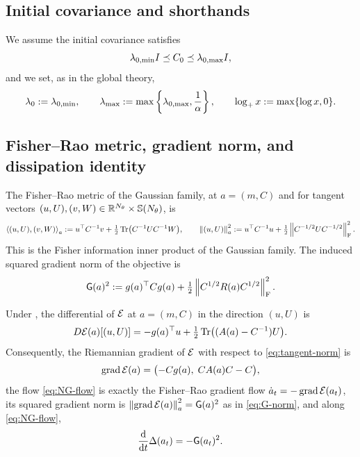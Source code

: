 \subsection{Initial covariance and shorthands}

We assume the initial covariance satisfies
\[
    \lambda_{0,\min}I\preceq C_0\preceq \lambda_{0,\max}I,
\]
and we set, as in the global theory,
\[
    \lambda_0:=\lambda_{0,\min},
    \qquad
    \lambda_{\max}:=
    \max\left\{
        \lambda_{0,\max},\frac1\alpha
    \right\},
    \qquad
    \log_+ x:=\max\{\log x,0\}.
\]

\subsection{Fisher--Rao metric, gradient norm, and dissipation identity}

The Fisher--Rao metric of the Gaussian family, at $a=(m,C)$ and for tangent vectors
$(u,U),(v,W)\in\mathbb{R}^{N_\theta}\times\mathbb{S}(N_\theta)$, is
\begin{equation}
\label{eq:tangent-norm}
    \left\langle (u,U),(v,W)\right\rangle_a
    :=
    u^\top C^{-1}v
    +
    \tfrac12\operatorname{Tr}\bigl(C^{-1}UC^{-1}W\bigr),
    \qquad
    \left\lVert (u,U)\right\rVert_a^2
    :=
    u^\top C^{-1}u+\tfrac12\left\lVert C^{-1/2}UC^{-1/2}\right\rVert_{\mathrm{F}}^2 .
\end{equation}
This is the Fisher information inner product of the Gaussian family. The induced squared
gradient norm of the objective is
\begin{equation}
\label{eq:G-norm}
    \mathsf{G}(a)^2
    :=
    g(a)^\top Cg(a)
    +
    \tfrac12\left\lVert C^{1/2}R(a)C^{1/2}\right\rVert_{\mathrm{F}}^2 .
\end{equation}

\begin{lemma}
\label{lem:metric-dissipation}
Under , the differential of $\mathcal{E}$ at $a=(m,C)$ in the
direction $(u,U)$ is
\[
    D\mathcal{E}(a)[(u,U)]
    =
    -g(a)^\top u
    +
    \tfrac12\operatorname{Tr}\bigl((A(a)-C^{-1})U\bigr).
\]
Consequently, the Riemannian gradient of $\mathcal{E}$ with respect to
\eqref{eq:tangent-norm} is
\[
    \operatorname{grad}\mathcal{E}(a)
    =
    \bigl(-Cg(a),\;CA(a)C-C\bigr),
\]
the flow \eqref{eq:NG-flow} is exactly the Fisher--Rao gradient flow
$\dot a_t=-\operatorname{grad}\mathcal{E}(a_t)$, its squared gradient norm is
$\left\lVert \operatorname{grad}\mathcal{E}(a)\right\rVert_a^2=\mathsf{G}(a)^2$ as in \eqref{eq:G-norm}, and along
\eqref{eq:NG-flow},
\[
    \frac{\mathrm{d}}{\mathrm{d} t}\Delta(a_t)
    =
    -\mathsf{G}(a_t)^2 .
\]
\end{lemma}

